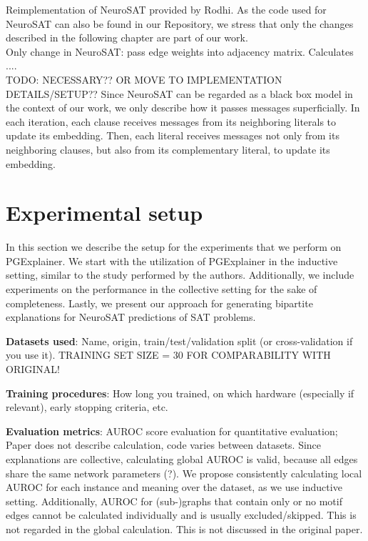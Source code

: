 Reimplementation of NeuroSAT provided by Rodhi. As the code used for NeuroSAT can also be found in our Repository, we stress that only the changes described in the following chapter are part of our work. \\


Only change in NeuroSAT: pass edge weights into adjacency matrix. Calculates .... \\



TODO: NECESSARY?? OR MOVE TO IMPLEMENTATION DETAILS/SETUP??
Since NeuroSAT can be regarded as a black box model in the context of our work, we only describe how it passes messages superficially. In each iteration, each clause receives messages from its neighboring literals to update its embedding. Then, each literal receives messages not only from its neighboring clauses, but also from its complementary literal, to update its embedding.



\section{Experimental setup}
In this section we describe the setup for the experiments that we perform on PGExplainer. We start with the utilization of PGExplainer in the inductive setting, similar to the study performed by the authors. Additionally, we include experiments on the performance in the collective setting for the sake of completeness. Lastly, we present our approach for generating bipartite explanations for NeuroSAT \cite{} predictions of SAT problems.



\textbf{Datasets used}: Name, origin, train/test/validation split (or cross-validation if you use it). TRAINING SET SIZE = 30 FOR COMPARABILITY WITH ORIGINAL!

\textbf{Training procedures}: How long you trained, on which hardware (especially if relevant), early stopping criteria, etc.

\textbf{Evaluation metrics}: AUROC score evaluation for quantitative evaluation; Paper does not describe calculation, code varies between datasets. Since explanations are collective, calculating global AUROC is valid, because all edges share the same network parameters (?). We propose consistently calculating local AUROC for each instance and meaning over the dataset, as we use inductive setting. Additionally, AUROC for (sub-)graphs that contain only or no motif edges cannot be calculated individually and is usually excluded/skipped. This is not regarded in the global calculation. This is not discussed in the original paper.

